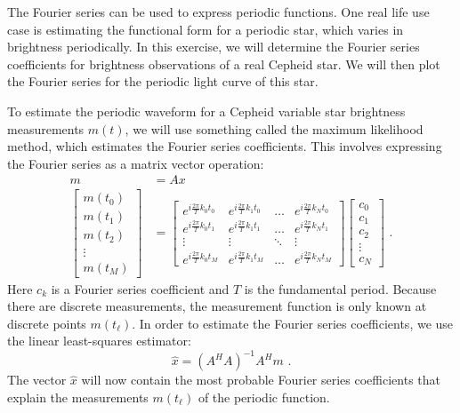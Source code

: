 The Fourier series can be used to express periodic functions. One real
life use case is estimating the functional form for a periodic star,
which varies in brightness periodically. In this exercise, we will
determine the Fourier series coefficients for brightness observations
of a real Cepheid star. We will then plot the Fourier series for the
periodic light curve of this star.

To estimate the periodic waveform for a Cepheid variable star
brightness measurements $m(t)$, we will use something called the
maximum likelihood method, which estimates the Fourier series
coefficients.  This involves expressing the Fourier series as a matrix
vector operation:
\begin{align}
m &= A x\\
\begin{bmatrix}
m(t_0)\\
m(t_1)\\
m(t_2)\\
\vdots \\
m(t_{M})
\end{bmatrix} &=
\begin{bmatrix}
e^{i\frac{2\pi}{T} k_0 t_0} & e^{i\frac{2\pi}{T} k_1 t_0} & \hdots & e^{i\frac{2\pi}{T} k_N t_0} \\
e^{i\frac{2\pi}{T} k_0 t_1} & e^{i\frac{2\pi}{T} k_1 t_1} & \hdots & e^{i\frac{2\pi}{T} k_N t_1} \\
\vdots & \vdots & \ddots & \vdots \\
e^{i\frac{2\pi}{T} k_0 t_M} & e^{i\frac{2\pi}{T} k_1 t_M} & \hdots & e^{i\frac{2\pi}{T} k_N t_M} 
\end{bmatrix} 
\begin{bmatrix}
c_0 \\
c_1 \\
c_2 \\
\vdots \\
c_N
\end{bmatrix}  \,\,.
\end{align}
Here $c_k$ is a Fourier series coefficient and $T$ is the fundamental
period. Because there are discrete measurements, the measurement
function is only known at discrete points $m(t_{\ell})$. In order to
estimate the Fourier series coefficients, we use the linear
least-squares estimator:
\begin{equation}
\hat{x} = (A^H A)^{-1}A^H m \,\,.
\end{equation}
The vector $\hat{x}$ will now contain the most probable Fourier series
coefficients that explain the measurements $m(t_{\ell})$ of the
periodic function.

